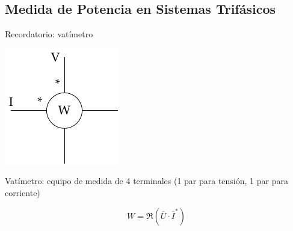 \documentclass[aspectratio=169, usenames,svgnames,dvipsnames]{beamer}
\begin{document}
\subsection{Medida de Potencia en Sistemas Trifásicos}
\label{sec:org0d737c1}
\begin{frame}[label={sec:org5ced2d3}]{Recordatorio: vatímetro}
\begin{center}
\includegraphics[height=0.6\textheight]{../figs/vatimetro.pdf}
\end{center}

\alert{Vatímetro}: equipo de medida de 4 terminales (1 par para tensión, 1 par para corriente)

\[
  \boxed{W = \Re(\overline{U} \cdot \overline{I}^*)}
\]
\end{frame}
\end{document}
